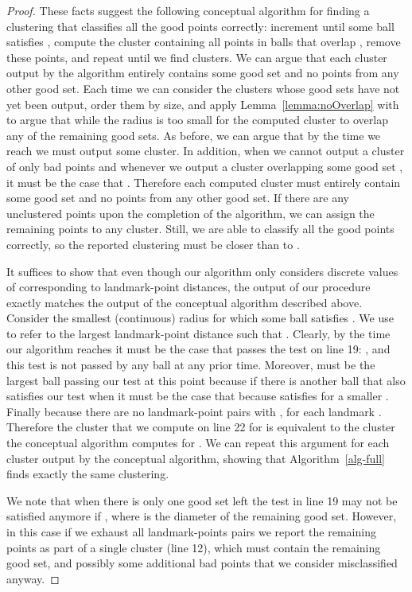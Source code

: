 \documentclass{llncs} \usepackage{algorithm}
\begin{document}
\begin{proof}
These facts suggest the following conceptual algorithm for finding a clustering that classifies all the good points correctly: increment  until some ball satisfies , compute the cluster containing all points in balls that overlap , remove these points, and repeat until we find  clusters.  We can argue that each cluster output by the algorithm entirely contains some good set and no points from any other good set.  Each time we can consider the clusters  whose good sets have not yet been output, order them by size, and apply Lemma~\ref{lemma:noOverlap} with  to argue that while  the radius is too small for the computed cluster to overlap any of the remaining good sets.  As before, we can argue that by the time we reach  we must output some cluster.  In addition, when  we cannot output a cluster of only bad points and whenever we output a cluster overlapping some good set , it must be the case that .  Therefore each computed cluster must entirely contain some good set and no points from any other good set.  If there are any unclustered points upon the completion of the algorithm, we can assign the remaining points to any cluster.  Still, we are able to classify all the good points correctly, so the reported clustering must be closer than  to .

It suffices to show that even though our algorithm only considers discrete values of  corresponding to landmark-point distances, the output of our procedure exactly matches the output of the conceptual algorithm described above.  Consider the smallest (continuous) radius  for which some ball  satisfies .  We use  to refer to the largest landmark-point distance such that .  Clearly, by the time our algorithm reaches  it must be the case that  passes the test on line 19: , and this test is not passed by any ball at any prior time.  Moreover,  must be the largest ball passing our test at this point because if there is another ball  that also satisfies our test when  it must be the case that  because  satisfies  for a smaller .  Finally because there are no landmark-point pairs  with ,  for each landmark .  Therefore the cluster that we compute on line 22 for  is equivalent to the cluster the conceptual algorithm computes for .  We can repeat this argument for each cluster output by the conceptual algorithm, showing that Algorithm~\ref{alg-full} finds exactly the same clustering.

We note that when there is only one good set left the test in line 19 may not be satisfied anymore if , where  is the diameter of the remaining good set.  However, in this case if we exhaust all landmark-points pairs we report the remaining points as part of a single cluster (line 12), which must contain the remaining good set, and possibly some additional bad points that we consider misclassified anyway.


\end{proof}
\end{document}
